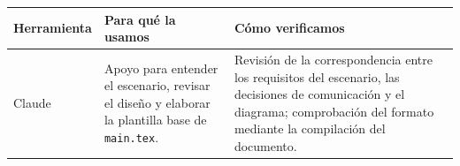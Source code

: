 \documentclass[11pt,a4paper]{article}
\begin{document}
\begingroup\footnotesize
\begin{tabularx}{\textwidth}{@{}p{2cm}XX@{}}
\textbf{Herramienta} & \textbf{Para qué la usamos} & \textbf{Cómo verificamos}\\
\hline
Claude & Apoyo para entender el escenario, revisar el diseño y elaborar la plantilla base de \texttt{main.tex}. & Revisión de la correspondencia entre los requisitos del escenario, las decisiones de comunicación y el diagrama; comprobación del formato mediante la compilación del documento.\\
\end{tabularx}
\endgroup

\nocite{*}
\printbibliography[title={Referencias}]
\end{document}
